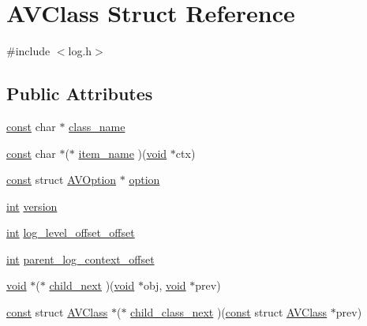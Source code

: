 \hypertarget{struct_a_v_class}{}\section{A\+V\+Class Struct Reference}
\label{struct_a_v_class}


{\ttfamily \#include $<$log.\+h$>$}

\subsection*{Public Attributes}
\begin{DoxyCompactItemize}
\item 
\hyperlink{getopt1_8c_a2c212835823e3c54a8ab6d95c652660e}{const} char $\ast$ \hyperlink{struct_a_v_class_aa8883e113a3f2965abd008f7667db7eb}{class\+\_\+name}
\item 
\hyperlink{getopt1_8c_a2c212835823e3c54a8ab6d95c652660e}{const} char $\ast$($\ast$ \hyperlink{struct_a_v_class_ad763b2e6a0846234a165e74574a550bd}{item\+\_\+name} )(\hyperlink{sound_8c_ae35f5844602719cf66324f4de2a658b3}{void} $\ast$ctx)
\item 
\hyperlink{getopt1_8c_a2c212835823e3c54a8ab6d95c652660e}{const} struct \hyperlink{struct_a_v_option}{A\+V\+Option} $\ast$ \hyperlink{struct_a_v_class_a75207076350fd2342191bc2091699f00}{option}
\item 
\hyperlink{xmltok_8h_a5a0d4a5641ce434f1d23533f2b2e6653}{int} \hyperlink{struct_a_v_class_a7859d861c0924aa74d848f93253c263a}{version}
\item 
\hyperlink{xmltok_8h_a5a0d4a5641ce434f1d23533f2b2e6653}{int} \hyperlink{struct_a_v_class_afbde6320c22278fac43732f7410b66e7}{log\+\_\+level\+\_\+offset\+\_\+offset}
\item 
\hyperlink{xmltok_8h_a5a0d4a5641ce434f1d23533f2b2e6653}{int} \hyperlink{struct_a_v_class_a88948c8a7c6515181771615a54a808bf}{parent\+\_\+log\+\_\+context\+\_\+offset}
\item 
\hyperlink{sound_8c_ae35f5844602719cf66324f4de2a658b3}{void} $\ast$($\ast$ \hyperlink{struct_a_v_class_a1e996ee57c93f5513281c04f68440cff}{child\+\_\+next} )(\hyperlink{sound_8c_ae35f5844602719cf66324f4de2a658b3}{void} $\ast$obj, \hyperlink{sound_8c_ae35f5844602719cf66324f4de2a658b3}{void} $\ast$prev)
\item 
\hyperlink{getopt1_8c_a2c212835823e3c54a8ab6d95c652660e}{const} struct \hyperlink{struct_a_v_class}{A\+V\+Class} $\ast$($\ast$ \hyperlink{struct_a_v_class_af1446f94b0cfc1de453319e972eed61d}{child\+\_\+class\+\_\+next} )(\hyperlink{getopt1_8c_a2c212835823e3c54a8ab6d95c652660e}{const} struct \hyperlink{struct_a_v_class}{A\+V\+Class} $\ast$prev)

\end{DoxyCompactItemize}
